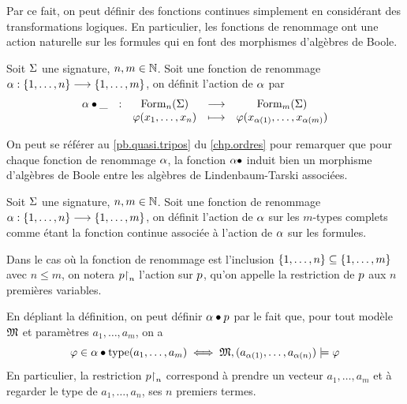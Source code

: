 Par ce fait, on peut définir des fonctions continues simplement en considérant
des transformations logiques. En particulier, les fonctions de renommage ont
une action naturelle sur les formules qui en font des morphismes d'algèbres de
Boole.

\begin{definition}
  Soit $\Sigma$ une signature, $n,m\in\mathbb N$. Soit une fonction de renommage
  $\alpha : \displaystyle \{1,\ldots,n\} \longrightarrow \{1,\ldots,m\}$, on définit l'action
  de $\alpha$ par
  \[\makeFun{\varRen\actRen\tok}{\Formula_n(\Sign)}{\Formula_m(\Sign)}
            {\varFF(x_1,\ldots,x_n)}{\varFF(x_{\varRen(1)},\ldots,x_{\varRen(m)})}\]
  \index[notation]{$\varRen\actRen\varFF$}
\end{definition}

\begin{remark}
  On peut se référer au \cref{pb.quasi.tripos} du \cref{chp.ordres} pour
  remarquer que pour chaque fonction de renommage $\alpha$, la fonction
  $\alpha\mathbin{\bullet}$ induit bien un morphisme d'algèbres de Boole entre les
  algèbres de Lindenbaum-Tarski associées.
\end{remark}

\begin{definition}
  Soit $\Sigma$ une signature, $n,m\in\mathbb N$. Soit une fonction de renommage
  $\alpha : \displaystyle \{1,\ldots,n\} \longrightarrow \{1,\ldots,m\}$, on définit l'action
  de $\alpha$ sur les $m$-types complets comme étant la fonction continue
  associée à l'action de $\alpha$ sur les formules.

  Dans le cas où la fonction de renommage est l'inclusion
  $\{1,\ldots,n\}\subseteq\{1,\ldots,m\}$ avec $n \leq m$, on notera
  $p\mathbin{\upharpoonright}_{n}$ l'action sur $p$, qu'on appelle la restriction de
  $p$ aux $n$ premières variables.
\end{definition}

\begin{remark}
  En dépliant la définition, on peut définir $\alpha\mathbin{\bullet}p$ par le
  fait que, pour tout modèle $\mathfrak{M}$ et paramètres $a_1,\ldots,a_m$, on a
  \[\varphi \in \alpha\mathbin{\bullet}\operatorname{type}(a_1,\ldots,a_m)\iff
  \mathfrak{M},(a_{\alpha(1)},\ldots,a_{\alpha(n)}) \models \varphi\]
  En particulier, la restriction $p\mathbin{\upharpoonright}_{n}$ correspond à prendre un
  vecteur $a_1,\ldots,a_m$ et à regarder le type de $a_1,\ldots,a_n$, ses
  $n$ premiers termes.
\end{remark}

